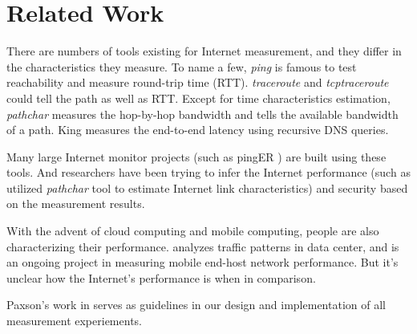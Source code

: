 \section{Related Work}
\label{sec:related-work}



There are numbers of tools existing for Internet measurement, and they differ in the characteristics they measure. To name a few, {\em ping} is famous to test reachability and measure round-trip time (RTT). {\em traceroute} \cite{jacobson1989traceroute} and {\em tcptraceroute} \cite{toren2001tcptraceroute} could tell the path as well as RTT. Except for time characteristics estimation, {\em pathchar} \cite{jacobson1997pathchar} measures the hop-by-hop bandwidth and \cite{jain2002pathload} tells the available bandwidth of a path. King \cite{gummadi2002king} measures the end-to-end latency using recursive DNS queries. 

Many large Internet monitor projects (such as pingER \cite{matthews2000pinger}) are built using these tools. And researchers have been trying to infer the Internet performance (such as \cite{downey1999using} utilized {\em pathchar} tool to estimate Internet link characteristics) and security \cite{paxson1999bro} based on the measurement results. 

With the advent of cloud computing and mobile computing, people are also characterizing their performance. \cite{kandula2009nature, benson2010network} analyzes traffic patterns in data center, and \cite{huang2011mobiperf} is an ongoing project in measuring mobile end-host network performance. But it's unclear how the Internet's performance is when in comparison.

Paxson's work in \cite{paxson2004strategies} serves as guidelines in our design and implementation of all measurement experiements.


